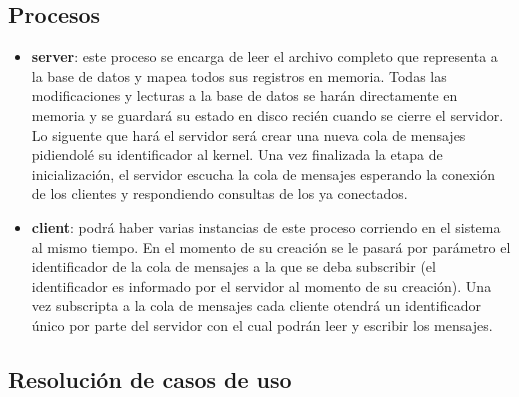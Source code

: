 \documentclass[a4paper,10pt]{article}
\begin{document}
\subsection{Procesos}

\begin{itemize}
\item \textbf{server}: este proceso se encarga de leer el archivo completo que representa a la base de datos y mapea todos sus registros en memoria. Todas las modificaciones y lecturas a la base de datos se harán directamente en memoria y se guardará su estado en disco recién cuando se cierre el servidor.
Lo siguente que hará el servidor será crear una nueva cola de mensajes pidiendolé su identificador al kernel.
Una vez finalizada la etapa de inicialización, el servidor escucha la cola de mensajes esperando la conexión de los clientes y respondiendo consultas de los ya conectados.

\item \textbf{client}: podrá haber varias instancias de este proceso corriendo en el sistema al mismo tiempo. En el momento de su creación se le pasará por parámetro el identificador de la cola de mensajes a la que se deba subscribir (el identificador es informado por el servidor al momento de su creación).
Una vez subscripta a la cola de mensajes cada cliente otendrá un identificador único por parte del servidor con el cual podrán leer y escribir los mensajes.

\end{itemize}

\subsection{Resolución de casos de uso}
\end{document}
